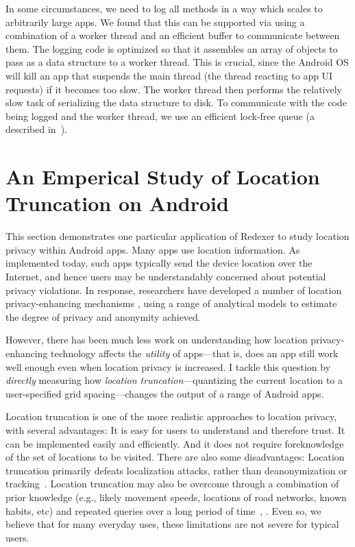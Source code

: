 In some circumstances, we need to log all methods in a way which
scales to arbitrarily large apps. We found that this can be supported
via using a combination of a worker thread and an efficient buffer to
communicate between them. The logging code is optimized so that it
assembles an array of objects to pass as a data structure to a worker
thread. This is crucial, since the Android OS will kill an app that
suspends the main thread (the thread reacting to app UI requests) if
it becomes too slow. The worker thread then performs the relatively
slow task of serializing the data structure to disk. To communicate
with the code being logged and the worker thread, we use an efficient
lock-free queue (a  described
in~\cite{Michael:1995}).

\section{An Emperical Study of Location Truncation on Android}
\label{sec:introduction}

This section demonstrates one particular application of Redexer to
study location privacy within Android apps. Many apps use location
information. As implemented today, such apps typically send the device
location over the Internet, and hence users may be understandably
concerned about potential privacy violations. In response, researchers
have developed a number of location privacy-enhancing mechanisms
\cite{Beresford:2004, Shokri:2011, Shokri:2012, Bettini:2005,
  Hoh:2005, Gruteser:2003}, using a range of analytical models to
estimate the degree of privacy and anonymity achieved.

However, there has been much less work \cite{Brush:2010} on
understanding how location privacy-enhancing technology affects the
\emph{utility} of apps---that is, does an app still work well enough
even when location privacy is increased.  I tackle this question by
\emph{directly} measuring how \emph{location truncation}---quantizing
the current location to a user-specified grid spacing---changes the
output of a range of Android apps.

Location truncation is one of the more realistic approaches to
location privacy, with several advantages: It is easy for users to
understand and therefore trust.  It can be implemented easily and
efficiently. And it does not require foreknowledge of the set of
locations to be visited. There are also some disadvantages: Location
truncation primarily defeats localization attacks, rather than
deanonymization or tracking~\cite{Krumm:2009}.  Location truncation
may also be overcome through a combination of prior knowledge (e.g.,
likely movement speeds, locations of road networks, known habits, etc)
and repeated queries over a long period of time~\cite{Gruteser:2005},
\cite{Krumm:2007}.  Even so, we believe that for many everyday uses,
these limitations are not severe for typical users.


